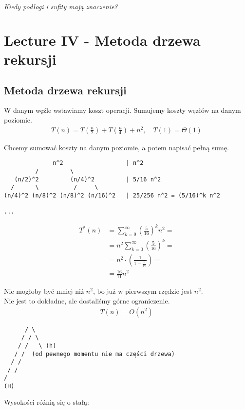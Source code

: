 \documentclass{article}
\begin{document}
\textit{Kiedy podłogi i sufity mają znaczenie?}

\section{Lecture IV - Metoda drzewa rekursji}

\subsection{Metoda drzewa rekursji}

W danym węźle wstawiamy koszt operacji. Sumujemy koszty węzłów na danym poziomie.\\

\begin{align}
    T(n) = T\left(\frac{n}{2}\right) + T\left(\frac{n}{4}\right) + n^2, \quad T(1) = \Theta(1)
\end{align}

\noindent
Chcemy sumować koszty na danym poziomie, a potem napisać pełną sumę.

\begin{verbatim}
              n^2                  | n^2
         /         \ 
   (n/2)^2         (n/4)^2         | 5/16 n^2
  /      \          /     \
(n/4)^2 (n/8)^2 (n/8)^2 (n/16)^2   | 25/256 n^2 = (5/16)^k n^2

...
\end{verbatim}

\begin{align}
    T^{*}(n) &= \sum_{k=0}^{\infty} \left(\frac{5}{16}\right)^k n^2 = \\
    &= n^2 \sum_{k=0}^{\infty} \left(\frac{5}{16}\right)^k = \\
    &= n^2 \cdot \left(\frac{1}{1-\frac{5}{16}}\right) = \\
    &= \frac{16}{11} n^2
\end{align}

\noindent
Nie mogłoby być mniej niż $n^2$, bo już w pierwszym rzędzie jest $n^2$.\\
Nie jest to dokładne, ale dostaliśmy górne ograniczenie.\\

\begin{align}
    T(n) = O(n^2)
\end{align}

\begin{verbatim}
      / \
     / / \
    / /   \ (h)
   / /  (od pewnego momentu nie ma części drzewa)
  / /
 / /
/   
(H)
\end{verbatim}
Wysokości różnią się o stałą:
\end{document}

